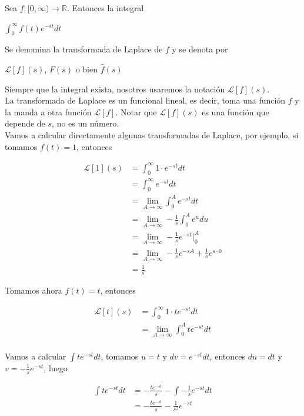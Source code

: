 \documentclass{article}
\theoremstyle{plain}
\theoremstyle{definition}
\begin{document}
Sea $f: [0, \infty) \to \mathbb{R}$. Entonces la integral

\begin{center}
$\displaystyle \int_0^\infty f(t)e^{-st} dt$
\end{center}

Se denomina la transformada de Laplace de $f$ y se denota por

\begin{center}
$\mathcal{L}[f](s)$, $F(s)$ o bien $\hat{f}(s)$
\end{center}

Siempre que la integral exista, nosotros usaremos la notación $\mathcal{L}[f](s)$. \\


La transformada de Laplace es un funcional lineal, es decir, toma una función $f$ y la manda a otra función $\mathcal{L}[f]$. Notar que $\mathcal{L}[f](s)$ es una función que depende de $s$, no es un número. \\


Vamos a calcular directamente algunas transformadas de Laplace, por ejemplo, si tomamos $f(t) = 1$, entonces


\begin{align*}
\displaystyle \mathcal{L}[1](s) &= \int_0^\infty 1 \cdot e^{-st} dt \\
&= \int_0^\infty e^{-st} dt \\
&= \lim_{A \to \infty} \int_0^A e^{-st} dt \\
&= \lim_{A \to \infty} -\frac{1}{s}\int_0^A e^{u} du \\
&= \lim_{A \to \infty} -\frac{1}{s}e^{-st} \bigg|_0^A \\
&= \lim_{A \to \infty} -\frac{1}{s}e^{-sA} + \frac{1}{s}e^{s \cdot 0}\\
&= \frac{1}{s}\
\end{align*}

Tomamos ahora $f(t) = t$, entonces

\begin{align*}
\displaystyle \mathcal{L}[t](s) &= \int_0^\infty 1 \cdot te^{-st} dt \\
&= \lim_{A \to \infty} \int_0^A te^{-st} dt \\
\end{align*}

Vamos a calcular $\displaystyle \int te^{-st}dt$, tomamos $u=t$ y $dv=e^{-st}dt$, entonces $du=dt$ y $v=\displaystyle -\frac{1}{s}e^{-st}$, luego

\begin{align*}
\displaystyle \int te^{-st}dt &= -\frac{te^{-st}}{s}- \int -\frac{1}{s}e^{-st} dt \\
&= -\frac{te^{-st}}{s}- \frac{1}{s^2}e^{-st} \\
\end{align*}
\end{document}
